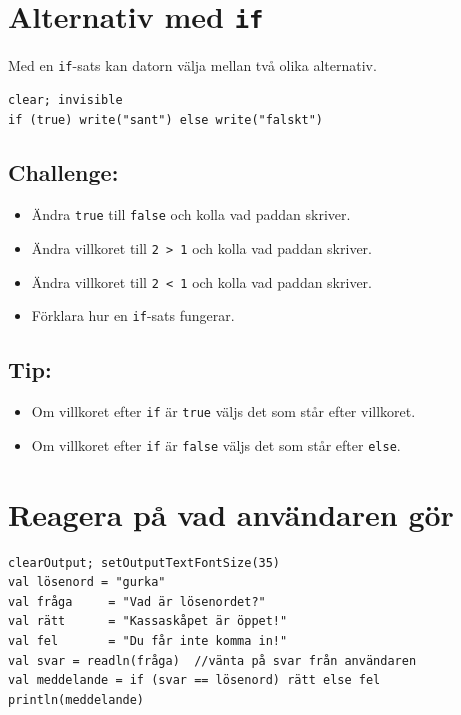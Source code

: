 \chapter{Alternativ med \lstinline{if}}Med en \lstinline{if}-sats kan datorn välja mellan två olika alternativ.

\begin{lstlisting}[basicstyle={\ttfamily\fontsize{20}{24}\selectfont},numbers=none]
clear; invisible
if (true) write("sant") else write("falskt")
\end{lstlisting}
        
\section*{\color{BrickRed}Challenge:}


\begin{itemize}

\item {Ändra \lstinline{true} till \lstinline{false} och kolla vad paddan skriver.}
\item {Ändra villkoret till \lstinline{2 > 1} och kolla vad paddan skriver.}
\item {Ändra villkoret till \lstinline{2 < 1} och kolla vad paddan skriver.}
\item {Förklara hur en \lstinline{if}-sats fungerar.}

\end{itemize}


\section*{\color{OliveGreen}Tip:}


\begin{itemize}

\item {Om villkoret efter \lstinline{if} är \lstinline{true} väljs det som står efter villkoret.}
\item {Om villkoret efter \lstinline{if} är \lstinline{false} väljs det som står efter \lstinline{else}.}

\end{itemize}


\chapter{Reagera på vad användaren gör}
\begin{lstlisting}[basicstyle={\ttfamily\fontsize{20}{24}\selectfont},numbers=none]
clearOutput; setOutputTextFontSize(35)
val lösenord = "gurka"
val fråga     = "Vad är lösenordet?"
val rätt      = "Kassaskåpet är öppet!"
val fel       = "Du får inte komma in!"
val svar = readln(fråga)  //vänta på svar från användaren
val meddelande = if (svar == lösenord) rätt else fel
println(meddelande)
\end{lstlisting}
        
